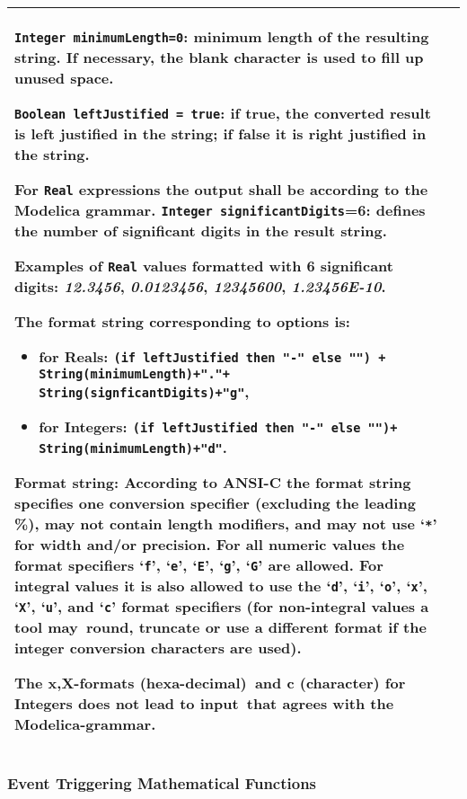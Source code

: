 \begin{longtable}{|p{4.5cm}|p{10cm}|}
\lstinline!Integer minimumLength=0!: minimum length of the resulting string. If
necessary, the blank character is used to fill up unused space.

\lstinline!Boolean leftJustified = true!: if true, the converted result is left
justified in the string; if false it is right justified in the string.

For \lstinline!Real! expressions the output shall be according to the Modelica
grammar. \lstinline!Integer significantDigits!=6: defines the number of significant
digits in the result string.

\begin{nonnormative}
Examples of \lstinline!Real! values formatted with 6 significant digits: \emph{12.3456}, \emph{0.0123456}, \emph{12345600}, \emph{1.23456E-10}.
\end{nonnormative}

The format string corresponding to options is:
\begin{itemize}
\item
  for Reals: %
  \lstinline!(if leftJustified then "-" else "") +  String(minimumLength)+"."+ String(signficantDigits)+"g"!,
\item
  for Integers: %
  \lstinline!(if leftJustified then "-" else "")+ String(minimumLength)+"d"!.
\end{itemize}

Format string: According to ANSI-C the format string specifies one
conversion specifier (excluding the leading \%), may not contain length
modifiers, and may not use `\lstinline!*!' for width and/or precision. For all
numeric values the format specifiers `\lstinline!f!', `\lstinline!e!', `\lstinline!E!', `\lstinline!g!', `\lstinline!G!' are allowed. For
integral values it is also allowed to use the `\lstinline!d!', `\lstinline!i!', `\lstinline!o!', `\lstinline!x!', `\lstinline!X!', `\lstinline!u!', and
`\lstinline!c!' format specifiers (for non-integral values a tool may~round, truncate
or use a different format if the integer conversion characters are
used).

The x,X-formats (hexa-decimal)~and c (character) for Integers does not
lead to input~that agrees with the Modelica-grammar.\\ \hline
\end{longtable}

\subsubsection{Event Triggering Mathematical Functions}

